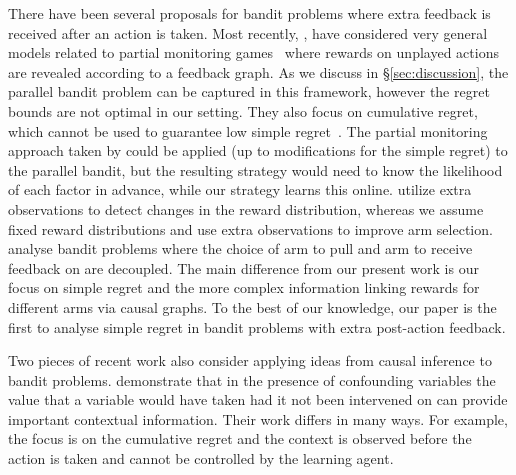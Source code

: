 \documentclass{article}
\newcommand{\bigtheta}[1]{\Theta\left( #1 \right)}
\newcommand{\bigthetatilde}[1]{\tilde{\Theta}\left( #1 \right)}
\newcommand{\bigomega}[1]{\Omega\left( #1 \right)}
\theoremstyle{plain}
\theoremstyle{definition}
\begin{document}
There have been several proposals for bandit problems where extra feedback is received after an action is taken.
Most recently, \citet{Alon2015}, \citet{Kocak2014} have considered very general models related to partial monitoring games~\citep{Bartok2014} where rewards on unplayed actions are revealed according to a feedback graph. As we discuss in \S\ref{sec:discussion}, the parallel bandit problem can be captured in this framework, however the regret bounds are not optimal in our setting. They also focus on cumulative regret, which cannot be used to guarantee low simple regret~\citep{Bubeck2009a}. The partial monitoring approach taken by \cite{wu2015online} could be applied (up to modifications for the simple regret) to the parallel bandit, but the resulting strategy would need to know the likelihood of each factor in advance, while our strategy learns this online. \citet{Yu2009} utilize extra observations to detect changes in the reward distribution, whereas we assume fixed reward distributions and use extra observations to improve arm selection. \citet{Avner2012} analyse bandit problems where the choice of arm to pull and arm to receive feedback on are decoupled. The main difference from our present work is our focus on simple regret and the more complex information linking rewards for different arms via causal graphs. To the best of our knowledge, our paper is the first to analyse simple regret in bandit problems with extra post-action feedback.



Two pieces of recent work also consider applying ideas from causal inference to bandit problems.
\citet{Bareinboim2015} demonstrate that in the presence of confounding variables the value that a variable would have taken had it not been 
intervened on can provide important contextual information. Their work differs in many ways. For example, the focus is on the cumulative regret and
the context is observed before the action is taken and cannot be controlled by the learning agent.  
\end{document}
